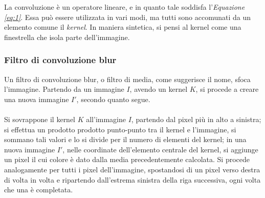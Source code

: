 \documentclass{subfiles}
\begin{document}
La convoluzione è un operatore lineare, e in quanto tale soddisfa l'\emph{Equazione \ref{eq:1}}.
Essa può essere utilizzata in vari modi, ma tutti sono accomunati da un elemento comune il \emph{kernel}.
In maniera sintetica, si pensi al kernel come una finestrella che isola parte dell'immagine.

\subsubsection{Filtro di convoluzione blur}
Un filtro di convoluzione blur, o filtro di media, come suggerisce il nome, sfoca l'immagine.
Partendo da un immagine \(I\), avendo un kernel \(K\), si procede a creare una nuova immagine \(I'\), secondo quanto segue.
\\ \\
Si sovrappone il kernel \(K\) all'immagine \(I\), partendo dal pixel più in alto a sinistra;
si effettua un prodotto prodotto punto-punto tra il kernel e l'immagine, si sommano tali valori e lo si divide per il numero di elementi del kernel;
in una nuova immagine \(I'\), nelle coordinate dell'elemento centrale del kernel, si aggiunge un pixel il cui colore è dato dalla media precedentemente calcolata.
Si procede analogamente per tutti i pixel dell'immagine, spostandosi di un pixel verso destra di volta in volta e ripartendo dall'estrema sinistra della riga successiva,
ogni volta che una è completata.\\
\end{document}

